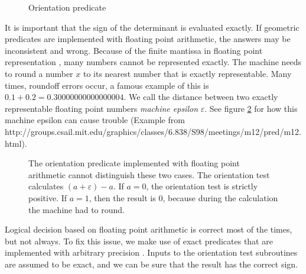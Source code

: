 \documentclass[../thesis.tex]{subfiles}
\begin{document}
\begin{figure}[htb]
  \centering
  \def\svgwidth{20em}
  
  \caption{Orientation predicate}\label{alg:orient2d}        
\end{figure}
It is important that the sign of the determinant is evaluated exactly.
If geometric predicates are implemented with floating point arithmetic,
the answers may be inconsistent and wrong.
Because of the finite mantissa in floating point representation \cite{ieee754}, many numbers cannot be represented exactly.
The machine needs to round a number $x$ to its nearest number that is exactly representable.
Many times, roundoff errors occur, a famous example of this is $0.1 + 0.2 = 0.30000000000000004$.
We call the distance between two exactly representable floating point numbers \emph{machine epsilon} $\varepsilon$.
See figure \ref{alg:floatingpoint} for how this machine epsilon can cause trouble (Example from http://groups.csail.mit.edu/graphics/classes/6.838/S98/meetings/m12/pred/m12.html).
\begin{figure}[htb]
  \centering
  \def\svgwidth{20em}
  
  \caption{The orientation predicate implemented with floating point arithmetic cannot distinguish these two cases.
  The orientation test calculates $(a+\varepsilon)-a$. If $a=0$, the orientation test is strictly positive.
  If $a=1$, then the result is $0$, because during the calculation the machine had to round.
  }\label{alg:floatingpoint}
\end{figure}
Logical decision based on floating point arithmetic is correct most of the times, but not always.
To fix this issue, we make use of exact predicates that are implemented with arbitrary precision \cite{RichardShewchuk1997}.
Inputs to the orientation test subroutines are assumed to be exact, and we can be sure
that the result has the correct sign.
\end{document}
